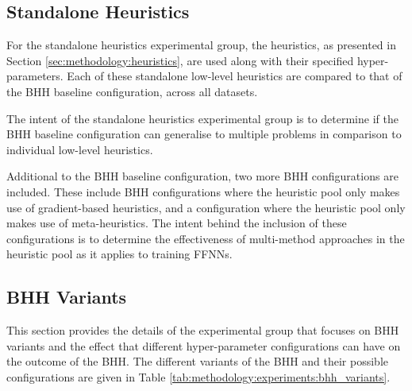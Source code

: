 \subsection{Standalone Heuristics}
\label{sec:methodology:experiments:standalone_optimisers}

For the standalone heuristics experimental group, the heuristics, as presented in Section \ref{sec:methodology:heuristics}, are used along with their specified hyper-parameters. Each of these standalone low-level heuristics are compared to that of the \acs{BHH} baseline configuration, across all datasets.

The intent of the standalone heuristics experimental group is to determine if the \acs{BHH} baseline configuration can generalise to multiple problems in comparison to individual low-level heuristics.

Additional to the \acs{BHH} baseline configuration, two more \acs{BHH} configurations are included. These include \acs{BHH} configurations where the heuristic pool only makes use of gradient-based heuristics, and a configuration where the heuristic pool only makes use of meta-heuristics. The intent behind the inclusion of these configurations is to determine the effectiveness of multi-method approaches in the heuristic pool as it applies to training \acp{FFNN}.

\subsection{BHH Variants}
\label{sec:methodology:experiments:bhh_variants}

This section provides the details of the experimental group that focuses on \acs{BHH} variants and the effect that different hyper-parameter configurations can have on the outcome of the \acs{BHH}. The different variants of the \acs{BHH} and their possible configurations are given in Table \ref{tab:methodology:experiments:bhh_variants}.


